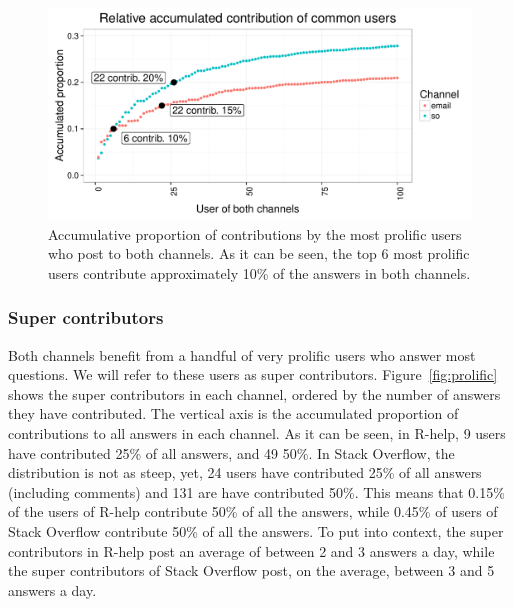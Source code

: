 \documentclass[smallextended]{svjour3}       %
\newcommand{\SO}{Stack Overflow\xspace}
\newcommand{\RH}{R-help\xspace}
\begin{document}
\begin{figure}[htbp]
  \centering
  \includegraphics[width=.95\textwidth]{figs/common.pdf}
  \caption{Accumulative proportion of contributions by the most prolific users who post to both channels. As it can be seen, the top 6
    most prolific users contribute approximately 10\% of the answers in both channels.}
  \label{fig:common}
\end{figure}

\subsubsection{Super contributors}

Both channels benefit from a handful of very prolific users who answer most questions. We will refer to these users as
super contributors. Figure~\ref{fig:prolific} shows the super contributors in each channel, ordered by the number of
answers they have contributed. The vertical axis is the accumulated proportion of contributions to all answers in
each channel. As it can be seen, in \RH, 9 users have contributed 25\% of all answers, and 49 50\%. In \SO, the distribution is not as
steep, yet, 24 users have contributed 25\% of all answers (including comments) and 131 are have contributed 50\%. This
means that 0.15\% of the users of \RH contribute 50\% of all the answers, while 0.45\% of users of \SO contribute 50\%
of all the answers. To put into context, the super contributors in \RH post an average of between 2 and 3 answers a day, while the
super contributors of \SO post, on the average, between 3 and 5 answers a day.
\end{document}
